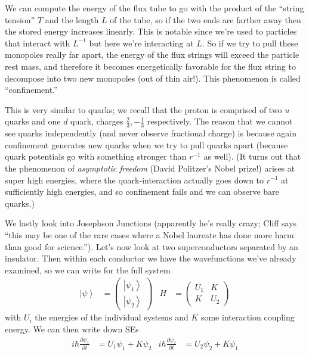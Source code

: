 \documentclass[10pt]{report}
\newcommand{\ket}[1]{\left|#1\right>}
\newcommand{\pd}[2]{\frac{\partial #1}{\partial#2}}
\begin{document}
We can compute the energy of the flux tube to go with the product of the ``string tension'' $T$ and the length $L$ of the tube, so if the two ends are farther away then the stored energy increases linearly. This is notable since we're used to particles that interact with $L^{-1}$ but here we're interacting at $L$. So if we try to pull these monopoles really far apart, the energy of the flux strings will exceed the particle rest mass, and therefore it becomes energetically favorable for the flux string to decompose into two new monopoles (out of thin air!). This phenomenon is called ``confinement.''

This is very similar to quarks; we recall that the proton is comprised of two $u$ quarks and one $d$ quark, charges $\frac{2}{3}, -\frac{1}{3}$ respectively. The reason that we cannot see quarks independently (and never observe fractional charge) is because again confinement generates new quarks when we try to pull quarks apart (because quark potentials go with something stronger than $r^{-1}$ as well). (It turns out that the phenomenon of \emph{asymptotic freedom} (David Politzer's Nobel prize!) arises at super high energies, where the quark-interaction actually goes down to $r^{-1}$ at sufficiently high energies, and so confinement fails and we can observe bare quarks.)

We lastly look into Josephson Junctions (apparently he's really crazy; Cliff says ``this may be one of the rare cases where a Nobel laureate has done more harm than good for science.''). Let's now look at two superconductors separated by an insulator. Then within each conductor we have the wavefunctions we've already examined, so we can write for the full system
\begin{align}
    \ket{\psi} &= \begin{pmatrix} \ket{\psi_1}\\ \ket{\psi_2} \end{pmatrix} & H &= \begin{pmatrix} U_1 & K \\ K & U_2 \end{pmatrix} 
\end{align}
with $U_i$ the energies of the individual systems and $K$ some interaction coupling energy. We can then write down SEs
\begin{align}
    i\hbar \pd{\psi_1}{t} &= U_1\psi_1 + K\psi_2 & i\hbar \pd{\psi_2}{t} &= U_2\psi_2 + K\psi_1
\end{align}
\end{document}
